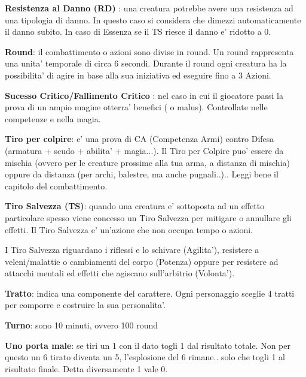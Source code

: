 \documentclass[a4paper,11pt,twoside,openany]{book}
\begin{document}
\textbf{Resistenza al Danno (RD)}  : una creatura potrebbe avere una resistenza ad una tipologia di danno. In questo caso si considera che dimezzi automaticamente il danno subito.
In caso di Essenza se il TS riesce il danno e' ridotto a 0.

\textbf{Round}: il combattimento o azioni sono divise in round. Un round rappresenta una unita' temporale di circa 6 secondi. Durante il round ogni creatura ha la possibilita' di agire in base alla sua iniziativa ed eseguire fino a 3 Azioni.

\textbf{Sucesso Critico/Fallimento Critico} : nel caso in cui il giocatore passi la prova di un ampio magine otterra' benefici ( o malus). Controllate nelle competenze e nella magia.

\textbf{Tiro per colpire}: e' una prova di CA (Competenza Armi) contro Difesa (armatura + scudo + abilita' + magia...). Il Tiro per Colpire puo' essere da mischia (ovvero per le creature prossime alla tua arma, a distanza di mischia) oppure da distanza (per archi, balestre, ma anche pugnali..).. Leggi bene il capitolo del combattimento.

\textbf{Tiro Salvezza (TS)}: quando una creatura e' sottoposta ad un effetto particolare spesso viene concesso un Tiro Salvezza per mitigare o annullare gli effetti. Il Tiro Salvezza e' un'azione che non occupa tempo o azioni. 

I Tiro Salvezza riguardano i riflessi e lo schivare (Agilita'), resistere a veleni/malattie o cambiamenti del corpo (Potenza) oppure per resistere ad attacchi mentali ed effetti che agiscano sull'arbitrio (Volonta').

\textbf{Tratto}: indica una componente del carattere. Ogni personaggio sceglie 4 tratti per comporre e costruire la sua personalita'.

\textbf{Turno}: sono 10 minuti, ovvero 100 round

\textbf{Uno porta male}: se tiri un 1 con il dato togli 1 dal risultato totale. Non per questo un 6 tirato diventa un 5, l’esplosione del 6 rimane.. solo che togli 1 al risultato finale. Detta diversamente 1 vale 0.


\end{document}
